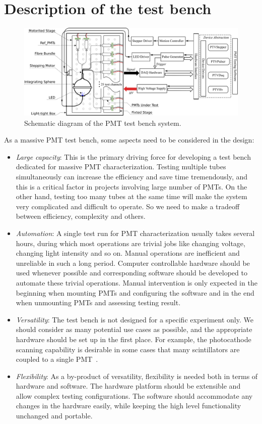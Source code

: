 \documentclass[5p, times]{elsarticle}
\begin{document}
\section{Description of the test bench}
\label{sec:description}

\begin{figure}
 \centering
 \includegraphics[width=160mm]{testbench_overview}
\caption{Schematic diagram of the PMT test bench system.}
\label{fig:testbench_overveiw}
\end{figure}

As a massive PMT test bench, some aspects need to be considered in the design:
\begin{itemize}
 \item \textit{Large capacity}: This is the primary driving force for developing a test bench dedicated for massive PMT characterization.
 Testing multiple tubes simultaneously can increase the efficiency and save time tremendously, and this is a critical factor in projects involving large number of PMTs. On the other hand, testing too many tubes at the same time will make the system very complicated and difficult to operate. So we need to make a tradeoff between efficiency, complexity and others.
 \item \textit{Automation}: A single test run for PMT characterization usually takes several hours, during which most operations are trivial jobs like changing voltage, changing light intensity and so on.
 Manual operations are inefficient and unreliable in such a long period.
 Computer controllable hardware should be used whenever possible and corresponding software should be developed to automate these trivial operations.
 Manual intervention is only expected in the beginning when mounting PMTs and configuring the software and in the end when unmounting PMTs and assessing testing result. 
 \item \textit{Versatility}: The test bench is not designed for a specific experiment only. We should consider as many potential use cases as possible, and the appropriate hardware should be set up in the first place.
 For example, the photocathode scanning capability is desirable in some cases that many scintillators are coupled to a single PMT~\cite{tof_pet}. 
 \item \textit{Flexibility}: As a by-product of versatility, flexibility is needed both in terms of hardware and software.
 The hardware platform should be extensible and allow complex testing configurations.
 The software should accommodate any changes in the hardware easily, while keeping the high level functionality unchanged and portable. 
\end{itemize}
\end{document}
